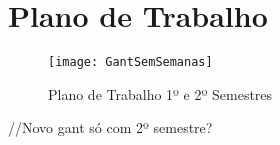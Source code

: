 \section{Plano de Trabalho}

\begin{figure}[t]
  \begin{center}
    \leavevmode
    \texttt{[image: GantSemSemanas]}
    \caption{Plano de Trabalho 1º e 2º Semestres}	
    \label{fig:planotrabalho}
  \end{center}
\end{figure}

//Novo gant só com 2º semestre?

